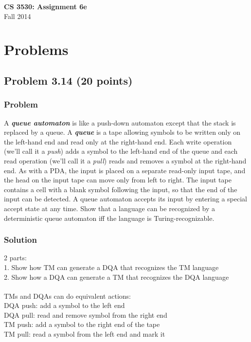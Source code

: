 \documentclass{article}
\begin{document}
\begin{center}
\textbf{\Large CS 3530: Assignment 6e} \\[2mm]
Fall 2014
\end{center}

\raggedright

\section*{Problems}

\subsection*{Problem 3.14 (20 points)}

\subsubsection*{Problem}

A \textit{\textbf{queue automaton}} is like a push-down automaton
except that the stack is replaced by a queue. A
\textit{\textbf{queue}} is a tape allowing symbols to be written
only on the left-hand end and read only at the right-hand end. Each
write operation (we'll call it a \textit{push}) adds a symbol to the
left-hand end of the queue and each read operation (we'll call it a
\textit{pull}) reads and removes a symbol at the right-hand end. As
with a PDA, the input is placed on a separate read-only input tape,
and the head on the input tape can move only from left to right. The
input tape contains a cell with a blank symbol following the input,
so that the end of the input can be detected. A queue automaton
accepts its input by entering a special accept state at any time.
Show that a language can be recognized by a deterministic queue
automaton iff the language is Turing-recognizable.

\subsubsection*{Solution}
2 parts: \\
1. Show how TM can generate a DQA that recognizes the TM language \\
2. Show how a DQA can generate a TM that recognizes the DQA language \\ \ \\

TMs and DQAs can do equivalent actions: \\
DQA push: add a symbol to the left end \\
DQA pull: read and remove symbol from the right end \\
TM push: add a symbol to the right end of the tape \\
TM pull: read a symbol from the left end and mark it \\ \ \\
\end{document}
